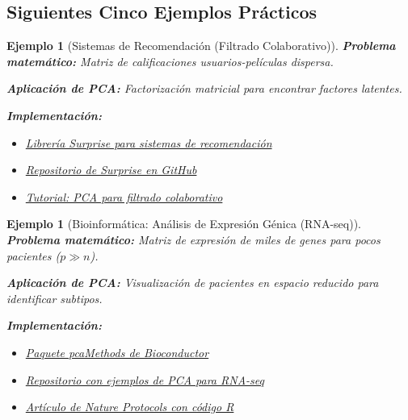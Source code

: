\documentclass[11pt]{article}
\theoremstyle{plain}
\newtheorem{example}[theorem]{Ejemplo}
\begin{document}
\subsection{Siguientes Cinco Ejemplos Prácticos}

\begin{example}[Sistemas de Recomendación (Filtrado Colaborativo)]
\label{ej:recomendacion}
\textbf{Problema matemático:} Matriz de calificaciones usuarios-películas dispersa.

\textbf{Aplicación de PCA:} Factorización matricial para encontrar factores latentes.

\textbf{Implementación:}
\begin{itemize}
    \item \href{https://surpriselib.com/}{Librería Surprise para sistemas de recomendación}
    \item \href{https://github.com/NicolasHug/Surprise}{Repositorio de Surprise en GitHub}
    \item \href{https://towardsdatascience.com/building-a-collaborative-filtering-recommender-system-with-pca-2723b3b2d68f}{Tutorial: PCA para filtrado colaborativo}
\end{itemize}
\end{example}

\begin{example}[Bioinformática: Análisis de Expresión Génica (RNA-seq)]
\label{ej:bioinfo}
\textbf{Problema matemático:} Matriz de expresión de miles de genes para pocos pacientes (\(p \gg n\)).

\textbf{Aplicación de PCA:} Visualización de pacientes en espacio reducido para identificar subtipos.

\textbf{Implementación:}
\begin{itemize}
    \item \href{https://bioconductor.org/packages/release/bioc/html/pcaMethods.html}{Paquete pcaMethods de Bioconductor}
    \item \href{https://github.com/broadinstitute/PCA-for-RNA-seq}{Repositorio con ejemplos de PCA para RNA-seq}
    \item \href{https://www.nature.com/articles/nprot.2015.124}{Artículo de Nature Protocols con código R}
\end{itemize}
\end{example}
\end{document}
